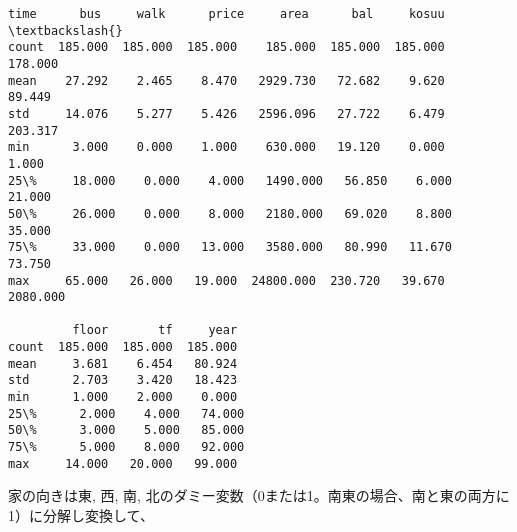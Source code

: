 \documentclass[a4paper,dvipdfmx]{jsarticle}
\begin{document}
    \begin{Verbatim}[commandchars=\\\{\}]
time      bus     walk      price     area      bal     kosuu  \textbackslash{}
count  185.000  185.000  185.000    185.000  185.000  185.000   178.000   
mean    27.292    2.465    8.470   2929.730   72.682    9.620    89.449   
std     14.076    5.277    5.426   2596.096   27.722    6.479   203.317   
min      3.000    0.000    1.000    630.000   19.120    0.000     1.000   
25\%     18.000    0.000    4.000   1490.000   56.850    6.000    21.000   
50\%     26.000    0.000    8.000   2180.000   69.020    8.800    35.000   
75\%     33.000    0.000   13.000   3580.000   80.990   11.670    73.750   
max     65.000   26.000   19.000  24800.000  230.720   39.670  2080.000   

         floor       tf     year  
count  185.000  185.000  185.000  
mean     3.681    6.454   80.924  
std      2.703    3.420   18.423  
min      1.000    2.000    0.000  
25\%      2.000    4.000   74.000  
50\%      3.000    5.000   85.000  
75\%      5.000    8.000   92.000  
max     14.000   20.000   99.000
    \end{Verbatim}

    家の向きは東, 西, 南,
北のダミー変数（0または1。南東の場合、南と東の両方に1）に分解し変換して、
\end{document}
